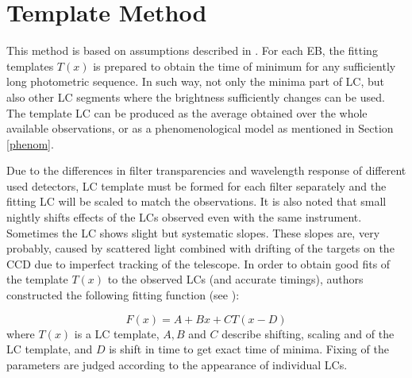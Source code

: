 \section{Template Method}
This method is based on assumptions described in \cite{Pribula2012, Pribulla2008}. 
For each EB, the fitting templates $T(x)$ is prepared to obtain the time of minimum 
for any sufficiently long photometric sequence. In such way, not only the minima part of LC, but also other LC segments where
the brightness sufficiently changes can be used. The template LC can be produced as the average obtained over the whole 
available observations, or as a phenomenological model as mentioned in Section \ref{phenom}.

Due to the differences in filter transparencies and wavelength response of different used detectors, 
LC template must be formed for each filter separately and the fitting LC will be scaled to match the observations.
It is also noted that small nightly shifts effects of the LCs observed even with the same
instrument. Sometimes the LC shows slight but systematic slopes. These slopes are, very probably, caused by scattered
light combined with drifting of the targets on the CCD due to imperfect tracking of the telescope.
In order to obtain good fits of the template $T(x)$ to the observed LCs (and accurate timings), authors constructed the following
fitting function (see \cite{Pribulla2008}):

\begin{equation}\label{eq:dwarf1}
F(x) = A+Bx+CT(x-D)
\end{equation}
where $T(x)$ is a LC template, $A,B$ and $C$ describe shifting,
scaling and  of the LC template, and $D$ is shift in time to get exact time of minima. Fixing of the
parameters are judged according to the appearance of individual LCs.